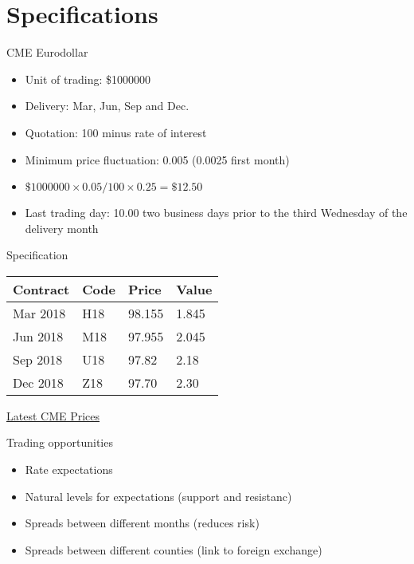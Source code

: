\documentclass[14pt,xcolor=pdftex,dvipsnames,table]{beamer}\usepackage[]{graphicx}\usepackage[]{color}
\begin{document}
\section{Specifications}
\begin{frame}{CME Eurodollar}
\begin{itemize}[<+-| alert@+>]
\pause
\item Unit of trading: \$1000000
\item Delivery: Mar, Jun, Sep and Dec. 
\item Quotation: 100 minus rate of interest
\item Minimum price fluctuation: 0.005 (0.0025 first month)
\item $ \$1000000 \times 0.05/100 \times 0.25 = \$12.50$
\item Last trading day: 10.00 two business days prior to the third Wednesday of the delivery month
\end{itemize}
\end{frame}

\begin{frame}{Specification}
\begin{center}
\begin{tabular}{llll}
Contract & Code & Price & Value\\
\hline
Mar 2018 & H18 & 98.155& 1.845\\
Jun 2018 & M18 & 97.955 & 2.045\\ 
Sep 2018 & U18 & 97.82 &2.18\\
Dec 2018 & Z18 & 97.70& 2.30\\
\hline
\end{tabular}
\end{center}
\href{www.cmegroup.com/trading/interest-rates/eurodollar.html}{Latest CME Prices}
\end{frame}

\begin{frame}{Trading opportunities}
\begin{itemize}[<+-| alert@+>]
\pause
\item Rate expectations
\item Natural levels for expectations (support and resistanc)
\item Spreads between different months (reduces risk)
\item Spreads between different counties (link to foreign exchange)
\end{itemize}
\end{frame}
\end{document}
